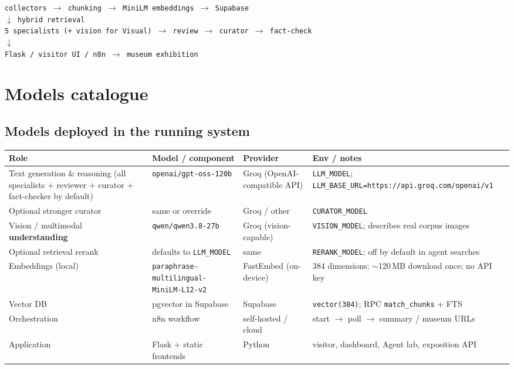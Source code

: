 \documentclass[11pt,a4paper]{article}
\begin{document}
\begin{center}
\small
\texttt{collectors $\rightarrow$ chunking $\rightarrow$ MiniLM embeddings $\rightarrow$ Supabase}\\[2pt]
\texttt{$\downarrow$ hybrid retrieval}\\[2pt]
\texttt{5 specialists (+ vision for Visual) $\rightarrow$ review $\rightarrow$ curator $\rightarrow$ fact-check}\\[2pt]
\texttt{$\downarrow$}\\[2pt]
\texttt{Flask / visitor UI / n8n $\rightarrow$ museum exhibition}
\end{center}

\section{Models catalogue}

\subsection{Models deployed in the running system}

\begin{longtable}{@{}p{3.2cm}p{4.2cm}p{2.2cm}p{5.2cm}@{}}
\toprule
\textbf{Role} & \textbf{Model / component} & \textbf{Provider} & \textbf{Env / notes} \\
\midrule
\endhead
Text generation \& reasoning (all specialists + reviewer + curator + fact-checker by default) &
\texttt{openai/gpt-oss-120b} &
Groq (OpenAI-compatible API) &
\texttt{LLM\_MODEL}; \texttt{LLM\_BASE\_URL=https://api.groq.com/openai/v1} \\
\addlinespace
Optional stronger curator &
same or override &
Groq / other &
\texttt{CURATOR\_MODEL} \\
\addlinespace
Vision / multimodal \textbf{understanding} &
\texttt{qwen/qwen3.8-27b} &
Groq (vision-capable) &
\texttt{VISION\_MODEL}; describes real corpus images \\
\addlinespace
Optional retrieval rerank &
defaults to \texttt{LLM\_MODEL} &
same &
\texttt{RERANK\_MODEL}; off by default in agent searches \\
\addlinespace
Embeddings (local) &
\texttt{paraphrase-multilingual-MiniLM-L12-v2} &
FastEmbed (on-device) &
384 dimensions; $\sim$120\,MB download once; no API key \\
\addlinespace
Vector DB &
pgvector in Supabase &
Supabase &
\texttt{vector(384)}; RPC \texttt{match\_chunks} + FTS \\
\addlinespace
Orchestration &
n8n workflow &
self-hosted / cloud &
start $\rightarrow$ poll $\rightarrow$ summary / museum URLs \\
\addlinespace
Application &
Flask + static frontends &
Python &
visitor, dashboard, Agent lab, exposition API \\
\bottomrule
\end{longtable}
\end{document}
